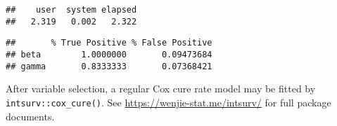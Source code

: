 \begin{verbatim}
##    user  system elapsed 
##   2.319   0.002   2.322
\end{verbatim}

\begin{Shaded}
\begin{Highlighting}[]
\end{Highlighting}
\end{Shaded}

\begin{verbatim}
##       % True Positive % False Positive
## beta        1.0000000       0.09473684
## gamma       0.8333333       0.07368421
\end{verbatim}

After variable selection, a regular Cox cure rate model may be fitted by
\texttt{intsurv::cox\_cure()}. See \url{https://wenjie-stat.me/intsurv/}
for full package documents.

